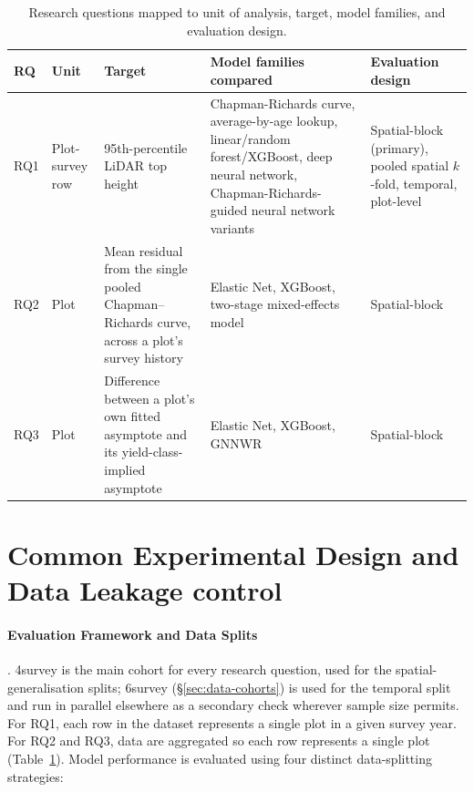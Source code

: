 \begin{table}[!htbp]
\scriptsize
\renewcommand{\arraystretch}{1.2}
\begin{tabular}{p{0.8cm}p{1.4cm}p{3.3cm}p{4.2cm}p{2.9cm}}
\toprule
RQ & Unit & Target & Model families compared & Evaluation design \\
\midrule
RQ1 & Plot-survey row & 95th-percentile LiDAR top height & Chapman-Richards curve, average-by-age
lookup, linear/random forest/XGBoost, deep neural network, Chapman-Richards-guided neural network
variants & Spatial-block (primary), pooled spatial $k$-fold, temporal, plot-level \\
RQ2 & Plot & Mean residual from the single pooled Chapman--Richards curve, across a plot's survey
history & Elastic Net, XGBoost, two-stage mixed-effects model & Spatial-block \\
RQ3 & Plot & Difference between a plot's own fitted asymptote and its yield-class-implied
asymptote & Elastic Net, XGBoost, GNNWR & Spatial-block \\
\bottomrule
\end{tabular}
\caption{Research questions mapped to unit of analysis, target, model families, and evaluation
design.}
\label{tab:rq-framework}
\end{table}

\section{Common Experimental Design and Data Leakage control}

\paragraph*{Evaluation Framework and Data Splits}. 4survey is the main cohort for every research question, used for the spatial-generalisation splits; 6survey (\S\ref{sec:data-cohorts}) is used for the temporal split and run in parallel elsewhere as a secondary check wherever sample size permits. For RQ1, each row in the dataset represents a single plot in a given survey year. For RQ2 and RQ3, data are aggregated so each row represents a single plot (Table~\ref{tab:rq-framework}). Model performance is evaluated using four distinct data-splitting strategies:

